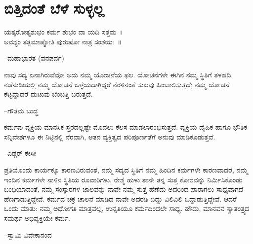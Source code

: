 
\chapter{ಬಿತ್ತಿದಂತೆ ಬೆಳೆ ಸುಳ್ಳಲ್ಲ}

\item ಯತ್ಕರೋತ್ಯಶುಭಂ ಕರ್ಮ ಶುಭಂ ವಾ ಯದಿ ಸತ್ತಮ~।\\ಅವಶ್ಯಂ ತತ್ಸಮಾಪ್ನೋತಿ ಪುರುಷೋ ನಾತ್ರ ಸಂಶಯಃ~॥\\
\begin{flushright}
–ಮಹಾಭಾರತ (ವನಪರ್ವ)
\end{flushright}

 \item ನಾವು ಸದ್ಯ ಏನಾಗಿರುವೆವೋ ಅದು ನಮ್ಮ ಯೋಚನೆಯ ಫಲ. ಯೋಚನೆಗಳೇ ಈಗಿನ ನಮ್ಮ ಸ್ಥಿತಿಗೆ ತಳಹದಿ. ನಡೆನುಡಿಯಲ್ಲಿ ನಮ್ಮ ಯೋಚನೆ ಒಳ್ಳೆಯದಾಗಿದ್ದರೆ ನೆರಳಿನಂತೆ ಸುಖವು ಹಿಂಬಾಲಿಸುತ್ತದೆ; ನಮ್ಮ ಯೋಚನೆ ಕೆಟ್ಟದ್ದಾದರೆ ದುಃಖವು ಬೆಂಬತ್ತಿ ಬರುತ್ತದೆ.\\
\begin{flushright}
–ಗೌತಮ ಬುದ್ಧ
\end{flushright}

 \item ಕರ್ಮವು ವ್ಯಕ್ತಿಯ ಮಾನಸಿಕ ಸ್ತರದಲ್ಲಷ್ಟೇ ಮೊದಲು ಕೆಲಸ ಮಾಡಲಾರಂಭಿಸುತ್ತದೆ. ವ್ಯಕ್ತಿಯ ದೈಹಿಕ ಹಾಗೂ ಭೌತಿಕ ಸನ್ನಿವೇಶಗಳೂ ಈ ನಿಟ್ಟಿನಲ್ಲಿ ನೆರವಾಗಿ, ಆತನ ವ್ಯಕ್ತಿತ್ವದ ಪರಿಪೂರ್ಣತೆಗೆ ಅನುವು ಮಾಡಿಕೊಡುತ್ತವೆ.\\
\begin{flushright}
–ಎಡ್ಗರ್ ಕೇಸೀ
\end{flushright}

 \item ಪ್ರತಿಯೊಂದು ಕಾರ್ಯಕ್ಕೂ ಕಾರಣವಿರುವಂತೆ, ನಮ್ಮ ಸದ್ಯದ ಸ್ಥಿತಿಗೆ ನಮ್ಮ ಹಿಂದಿನ ಕರ್ಮಗಳೇ ಕಾರಣವಾದರೆ, ನಮ್ಮ ಇಂದಿನ ಕರ್ಮಗಳೇ ನಾಳಿನ ಸ್ಥಿತಿಯ ರೂವಾರಿಗಳು. ರೇಶ್ಮೆ ಹುಳು ತಾನೇ ತನ್ನ ಸುತ್ತ ಕೋಶವನ್ನು ನಿರ್ಮಿಸಿಕೊಂಡು ಬಂಧಿಯಾದಂತೆ, ನಮ್ಮ ಸಂಸ್ಕಾರಗಳ ಜಾಲವನ್ನು ನಾವೇ ನಮ್ಮ ಸುತ್ತ ಹೆಣೆದು ಅದರಿಂದ ಪಾರಾಗಲು ಸಾಧ್ಯವಾಗದೆ ಹೆಣಗಾಡುತ್ತಿದ್ದೇವೆ. ಕರ್ಮದ ಚಕ್ರ ಚಾಲನೆ ಮಾಡಿದ ನಾವೇ ಅದರಡಿ ಬಿದ್ದು ವಿಲಿವಿಲಿ ಒದ್ದಾಡುತ್ತಿದ್ದೇವೆ. ಆದರೆ ಒಂದು ಮಾತು: ನಮ್ಮ ಅಧೋಗತಿ ಮಾತ್ರವಲ್ಲ, ಉನ್ನತಿಯೂ ಕರ್ಮದಿಂದಲೇ ಸಾಧ್ಯ. ಹೌದು, ಮಾನವನ ಸ್ವಾತಂತ್ರ್ಯದ ಸಮರ್ಥ ಅಭಿವ್ಯಕ್ತಿಯೇ ಕರ್ಮ.\\
\begin{flushright}
–ಸ್ವಾಮಿ ವಿವೇಕಾನಂದ
\end{flushright}

 \item {}\\
\begin{flushright}
\end{flushright}

 \item {}\\
\begin{flushright}
\end{flushright}



